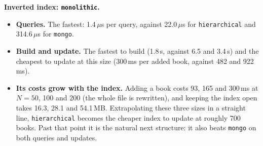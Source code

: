 \documentclass[11pt,a4paper]{article}
\newcommand{\code}[1]{\texttt{#1}}
\newcommand{\us}{\,$\mu$s}
\begin{document}
\textbf{Inverted index: \code{monolithic}.}
\begin{itemize}
  \item \textbf{Queries.} The fastest: 1.4\us{} per query, against 22.0\us{} for \code{hierarchical}
        and 314.6\us{} for \code{mongo}.
  \item \textbf{Build and update.} The fastest to build (1.8\,s, against 6.5 and 3.4\,s) and the
        cheapest to update at this size (300\,ms per added book, against 482 and 922\,ms).
  \item \textbf{Its costs grow with the index.} Adding a book costs 93, 165 and 300\,ms at
        $N = 50$, 100 and 200 (the whole file is rewritten), and keeping the index open takes 16.3,
        28.1 and 54.1\,MB. Extrapolating these three sizes in a straight line, \code{hierarchical}
        becomes the cheaper index to update at roughly 700 books. Past that point it is the natural
        next structure: it also beats \code{mongo} on both queries and updates.
\end{itemize}
\end{document}
